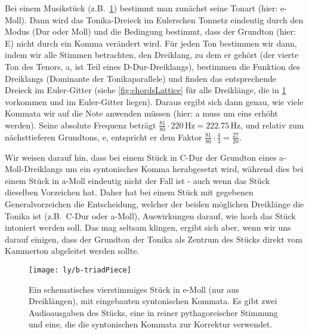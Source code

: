 \documentclass[british,11pt]{scrartcl}
\begin{document}
Bei einem Musikstück (z.B.\ \cref{fig:triadPiece}) bestimmt man zunächst seine
Tonart (hier: e-Moll). Dann wird das Tonika-Dreieck im Eulerschen Tonnetz
eindeutig durch den Modus (Dur oder Moll) und die Bedingung bestimmt, dass der
Grundton (hier: E) nicht durch ein Komma verändert wird. Für jeden Ton bestimmen
wir dann, indem wir alle Stimmen betrachten, den Dreiklang, zu dem er gehört
(der vierte Ton des Tenors, a, ist Teil eines D-Dur-Dreiklangs), bestimmen die
Funktion des Dreiklangs (Dominante der Tonikaparallele) und finden das
entsprechende Dreieck im Euler-Gitter (siehe \cref{fig:chordsLattice} für alle
Dreiklänge, die in \cref{fig:triadPiece} vorkommen und im Euler-Gitter liegen).
Daraus ergibt sich dann genau, wie viele Kommata wir auf die Note anwenden
müssen (hier: a muss um eins erhöht werden). Seine absolute Frequenz beträgt
$\frac{81}{80}\cdot 220\,\text{Hz}=222.75\,\text{Hz}$, und relativ zum
nächsttieferen Grundtons, e, entspricht er dem Faktor 
$\frac{81}{80}\cdot\frac{4}{3}=\frac{27}{20}$.

Wir weisen darauf hin, dass bei einem Stück in C-Dur der Grundton eines
a-Moll-Dreiklangs um ein syntonisches Komma herabgesetzt wird, während dies bei
einem Stück in a-Moll eindeutig nicht der Fall ist - auch wenn das Stück
dieselben Vorzeichen hat. Daher hat bei einem Stück mit gegebenen
Generalvorzeichen die Entscheidung, welcher der beiden möglichen Dreiklänge die
Tonika ist (z.B.\ C-Dur oder a-Moll), Auswirkungen darauf, wie hoch das Stück
intoniert werden soll. Das mag seltsam klingen, ergibt sich aber, wenn wir uns
darauf einigen, dass der Grundton der Tonika als Zentrum des Stücks direkt vom
Kammerton abgeleitet werden sollte.

\begin{figure}
  \centering
  \texttt{[image: ly/b-triadPiece]}
  \caption{Ein schematisches vierstimmiges Stück in e-Moll (nur aus
  	Dreiklängen), mit eingebauten syntonischen Kommata. Es gibt zwei
  	Audioausgaben des Stücks, eine in reiner pythagoreischer Stimmung und eine,
  	die die syntonischen Kommata zur Korrektur
  	verwendet.}\label{fig:triadPiece}
\end{figure}
\end{document}

